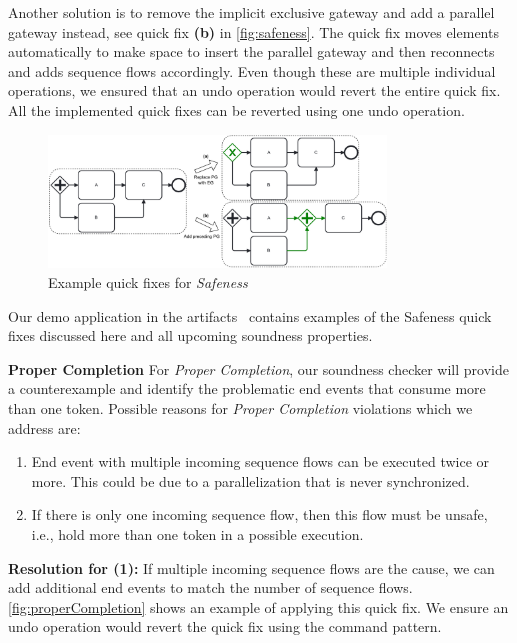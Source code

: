 \documentclass[runningheads]{llncs}
\newcommand{\subpart}[1]{\vspace{1em}\noindent\textbf{#1}}
\begin{document}
Another solution is to remove the implicit exclusive gateway and add a parallel gateway instead, see quick fix \textbf{(b)} in \autoref{fig:safeness}.
The quick fix moves elements automatically to make space to insert the parallel gateway and then reconnects and adds sequence flows accordingly.
Even though these are multiple individual operations, we ensured that an undo operation would revert the entire quick fix.
All the implemented quick fixes can be reverted using one undo operation.

\begin{figure}[ht]
	\centering
	\includegraphics[width=0.8\textwidth]{images/safeness}
	\caption{Example quick fixes for \textit{Safeness}}
	\label{fig:safeness}
\end{figure}

Our demo application in the artifacts~\cite{noauthorgivenBPM2024Artifacts2024} contains examples of the Safeness quick fixes discussed here and all upcoming soundness properties.

\subpart{Proper Completion}
For \textit{Proper Completion}, our soundness checker will provide a counterexample and identify the problematic end events that consume more than one token.
Possible reasons for \textit{Proper Completion} violations which we address are:

\begin{enumerate}
	\item End event with multiple incoming sequence flows can be executed twice or more.
	This could be due to a parallelization that is never synchronized.
	\item If there is only one incoming sequence flow, then this flow must be unsafe, i.e., hold more than one token in a possible execution.
\end{enumerate}

\textbf{Resolution for (1):} If multiple incoming sequence flows are the cause, we can add additional end events to match the number of sequence flows.
\autoref{fig:properCompletion} shows an example of applying this quick fix.
We ensure an undo operation would revert the quick fix using the command pattern.
\end{document}
